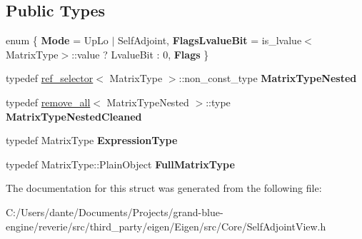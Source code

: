 \subsection*{Public Types}
\begin{DoxyCompactItemize}
\item 
\mbox{\label{struct_eigen_1_1internal_1_1traits_3_01_self_adjoint_view_3_01_matrix_type_00_01_up_lo_01_4_01_4_a9fa86d16bdcced476163b3beb937296e}} 
enum \{ {\bfseries Mode} = Up\+Lo $\vert$ Self\+Adjoint, 
{\bfseries Flags\+Lvalue\+Bit} = is\+\_\+lvalue$<$Matrix\+Type$>$\+::value ? Lvalue\+Bit \+: 0, 
{\bfseries Flags}
 \}
\item 
\mbox{\label{struct_eigen_1_1internal_1_1traits_3_01_self_adjoint_view_3_01_matrix_type_00_01_up_lo_01_4_01_4_a78fbe1472ee4d87826b253c2b194062b}} 
typedef \mbox{\hyperlink{struct_eigen_1_1internal_1_1ref__selector}{ref\+\_\+selector}}$<$ Matrix\+Type $>$\+::non\+\_\+const\+\_\+type {\bfseries Matrix\+Type\+Nested}
\item 
\mbox{\label{struct_eigen_1_1internal_1_1traits_3_01_self_adjoint_view_3_01_matrix_type_00_01_up_lo_01_4_01_4_a9a5dcf20cb07f9a3fb8f7ec32f8eaaad}} 
typedef \mbox{\hyperlink{struct_eigen_1_1internal_1_1remove__all}{remove\+\_\+all}}$<$ Matrix\+Type\+Nested $>$\+::type {\bfseries Matrix\+Type\+Nested\+Cleaned}
\item 
\mbox{\label{struct_eigen_1_1internal_1_1traits_3_01_self_adjoint_view_3_01_matrix_type_00_01_up_lo_01_4_01_4_aeaf9375b523c8415dddb7e48b60a3347}} 
typedef Matrix\+Type {\bfseries Expression\+Type}
\item 
\mbox{\label{struct_eigen_1_1internal_1_1traits_3_01_self_adjoint_view_3_01_matrix_type_00_01_up_lo_01_4_01_4_a0580ec066d0f63149d93af28a0c1ce84}} 
typedef Matrix\+Type\+::\+Plain\+Object {\bfseries Full\+Matrix\+Type}
\end{DoxyCompactItemize}


The documentation for this struct was generated from the following file\+:\begin{DoxyCompactItemize}
\item 
C\+:/\+Users/dante/\+Documents/\+Projects/grand-\/blue-\/engine/reverie/src/third\+\_\+party/eigen/\+Eigen/src/\+Core/Self\+Adjoint\+View.\+h\end{DoxyCompactItemize}
